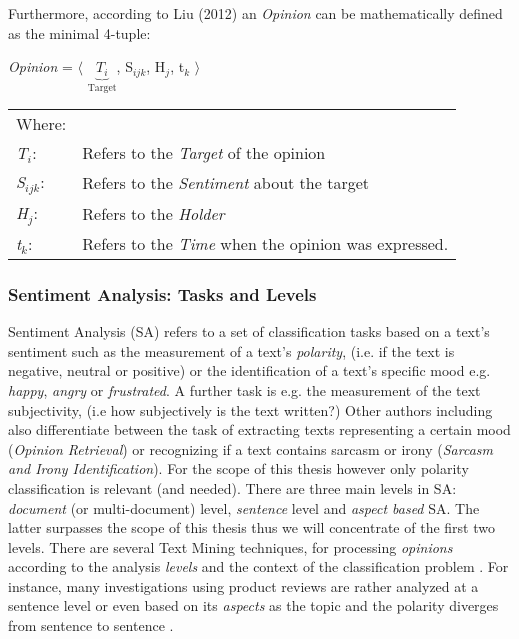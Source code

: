 \documentclass[
	a4paper,
	pdftex,
	12pt,	
	footinclude=true,
	fleqn,
	final,
	]{report}%
\begin{document}
Furthermore, according to Liu (2012) an \emph{Opinion} can be mathematically defined as the minimal 4-tuple:
\begin{center}
\textit{Opinion} = $\langle$ $\underbrace{T_{i}}_{\text{Target}}$,\hspace{0.3cm} S$_{ijk}$, \hspace{0.3cm} H$_{j}$,\hspace{0.3cm} t$_{k}$  $\rangle$
\end{center}
\label{def:opinion}

\begin{flushleft}
\begin{center}
\begin{tabular}{p{0.5cm}p{13cm}}
Where: & \\
\textit{T$_{i}$}: & Refers to the \textit{Target} of the opinion\\
\textit{S$_{ijk}$}: & Refers to the \textit{Sentiment} about the target\\
\textit{H$_{j}$}: & Refers to the \textit{Holder}\\
\textit{t$_{k}$}: & Refers to the \textit{Time} when the opinion was expressed.\\
\end{tabular}
\end{center}
\end{flushleft}

\vspace{-0.45cm}
\subsubsection*{Sentiment Analysis: Tasks and Levels}
\label{sec:sa}
\vspace{-0.3cm}
Sentiment Analysis (SA) refers to a set of classification tasks based on 
a text's sentiment \cite{Pang2008} such as the
measurement of a text's \emph{polarity}, (i.e. if the text is negative, neutral or positive) 
or the identification of a text's specific mood e.g. \emph{happy}, 
\emph{angry} or \emph{frustrated}. A further task is e.g. the measurement 
of the text subjectivity, (i.e how subjectively is the text written?)  
Other authors including \cite{Serrano2015} also differentiate between the task 
of extracting texts representing a certain mood (\emph{Opinion Retrieval}) or
recognizing if a text contains sarcasm or irony 
(\emph{Sarcasm and Irony Identification}). For the scope of this thesis however 
only polarity classification is relevant (and needed).
There are three main
levels in SA: \emph{document} (or multi-document) level, 
\emph{sentence} level and \emph{aspect based} SA. The latter surpasses
the scope of this thesis thus we will concentrate of the first two levels.
There are several Text Mining techniques, for processing \emph{opinions} 
according to the analysis \emph{levels} and the context 
of the classification problem \cite{Pang2002}. For instance,
many investigations using product reviews \cite{Devi2012,Ye2009,Strapparava2015}
are rather analyzed at a sentence level or even based on its \emph{aspects} as 
the topic and the polarity diverges from sentence to sentence \cite{Pang2002}.
\end{document}
